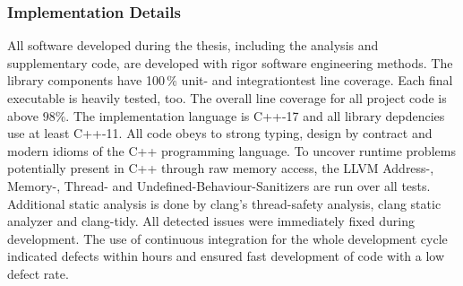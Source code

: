 \subsubsection{Implementation Details}

All software developed during the thesis, including the analysis and supplementary code, are developed with rigor software engineering methods.
The library components have 100\,\% unit- and integrationtest line coverage.
Each final executable is heavily tested, too.
The overall line coverage for all project code is above $98\%$.
The implementation language is C++-17\cite{c++17} and all library depdencies use at least C++-11\cite{c++11}.
All code obeys to strong typing, design by contract\cite{meyer_ieee1992} and modern idioms of the C++ programming language\cite{stroustrup_cpppl2013}.
To uncover runtime problems potentially present in C++ through raw memory access, the LLVM Address-, Memory-, Thread- and Undefined-Behaviour-Sanitizers\cite{google_sanitizers} are run over all tests.
Additional static analysis is done by clang's thread-safety analysis\cite{clang_thread_safety}, clang static analyzer\cite{clang_static_analyzer} and clang-tidy\cite{babati2017static}.
All detected issues were immediately fixed during development.
The use of continuous integration\cite{fowler_ci2000} for the whole development cycle indicated defects within hours and ensured fast development of code with a low defect rate.

